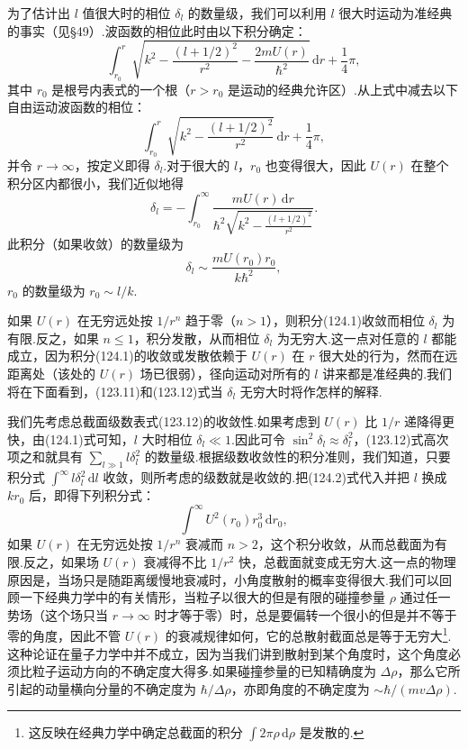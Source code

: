 为了估计出 $l$ 值很大时的相位 $\delta_l$ 的数量级，我们可以利用 $l$ 很大时运动为准经典的事实（见§49）.波函数的相位此时由以下积分确定：
\begin{equation*}
  \int_{r_0}^{r}\sqrt{k^2-\frac{(l+1/2)^2}{r^2}
  -\frac{2mU(r)}{\hbar^2}}\,\mathrm{d}r+\frac{1}{4}\pi,
\end{equation*}
其中 $r_0$ 是根号内表式的一个根（$r>r_0$ 是运动的经典允许区）.从上式中减去以下自由运动波函数的相位：
\begin{equation*}
  \int_{r_0}^{r}\sqrt{k^2-\frac{(l+1/2)^2}{r^2}}\,\mathrm{d}r
  +\frac{1}{4}\pi,
\end{equation*}
并令 $r\to\infty$，按定义即得 $\delta_l$.对于很大的 $l$，$r_0$ 也变得很大，因此 $U(r)$ 在整个积分区内都很小，我们近似地得
\begin{equation}
  \delta_l=-\int_{r_0}^{\infty}
  \frac{mU(r)\,\mathrm{d}r}{\hbar^2\sqrt{k^2-\frac{(l+1/2)^2}{r^2}}}.
\end{equation}
此积分（如果收敛）的数量级为
\begin{equation}
  \delta_l\sim\frac{mU(r_0)r_0}{k\hbar^2},
\end{equation}
$r_0$ 的数量级为 $r_0\sim l/k$.

如果 $U(r)$ 在无穷远处按 $1/r^n$ 趋于零（$n>1$），则积分(124.1)收敛而相位 $\delta_l$ 为有限.反之，如果 $n\leqslant1$，积分发散，从而相位 $\delta_l$ 为无穷大.这一点对任意的 $l$ 都能成立，因为积分(124.1)的收敛或发散依赖于 $U(r)$ 在 $r$ 很大处的行为，然而在远距离处（该处的 $U(r)$ 场已很弱），径向运动对所有的 $l$ 讲来都是准经典的.我们将在下面看到，(123.11)和(123.12)式当 $\delta_l$ 无穷大时将作怎样的解释.

我们先考虑总截面级数表式(123.12)的收敛性.如果考虑到 $U(r)$ 比 $1/r$ 递降得更快，由(124.1)式可知，$l$ 大时相位 $\delta_l\ll1$.因此可令 $\sin^2\delta_l\approx\delta_l^2$，(123.12)式高次项之和就具有 $\sum_{l\gg1}l\delta_l^2$ 的数量级.根据级数收敛性的积分准则，我们知道，只要积分式 $\int^{\infty}l\delta_l^2\,\mathrm{d}l$ 收敛，则所考虑的级数就是收敛的.把(124.2)式代入并把 $l$ 换成 $kr_0$ 后，即得下列积分式：
\begin{equation*}
  \int^{\infty}U^2(r_0)r_0^3\,\mathrm{d}r_0,
\end{equation*}
如果 $U(r)$ 在无穷远处按 $1/r^n$ 衰减而 $n>2$，这个积分收敛，从而总截面为有限.反之，如果场 $U(r)$ 衰减得不比 $1/r^2$ 快，总截面就变成无穷大.这一点的物理原因是，当场只是随距离缓慢地衰减时，小角度散射的概率变得很大.我们可以回顾一下经典力学中的有关情形，当粒子以很大的但是有限的碰撞参量 $\rho$ 通过任一势场（这个场只当 $r\to\infty$ 时才等于零）时，总是要偏转一个很小的但是并不等于零的角度，因此不管 $U(r)$ 的衰减规律如何，它的总散射截面总是等于无穷大\footnote{这反映在经典力学中确定总截面的积分 $\int 2\pi\rho\,\mathrm{d}\rho$ 是发散的.}.这种论证在量子力学中并不成立，因为当我们讲到散射到某个角度时，这个角度必须比粒子运动方向的不确定度大得多.如果碰撞参量的已知精确度为 $\Delta\rho$，那么它所引起的动量横向分量的不确定度为 $\hbar/\Delta\rho$，亦即角度的不确定度为 $\sim\hbar/(mv\Delta\rho)$.

